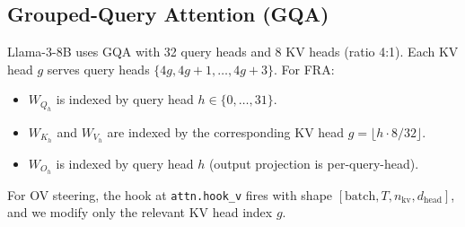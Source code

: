 \documentclass{article} %
\theoremstyle{plain}
\theoremstyle{definition}
\theoremstyle{remark}
\newcommand{\dhead}{d_{\mathrm{head}}}
\begin{document}
\subsection{Grouped-Query Attention (GQA)}
\label{app:gqa}

Llama-3-8B uses GQA with 32 query heads and 8 KV heads (ratio 4:1). Each KV head $g$ serves query heads $\{4g, 4g+1, \ldots, 4g+3\}$. For FRA:
\begin{itemize}
    \item $W_{Q_h}$ is indexed by query head $h \in \{0, \ldots, 31\}$.
    \item $W_{K_h}$ and $W_{V_h}$ are indexed by the corresponding KV head $g = \lfloor h \cdot 8 / 32 \rfloor$.
    \item $W_{O_h}$ is indexed by query head $h$ (output projection is per-query-head).
\end{itemize}
For OV steering, the hook at \texttt{attn.hook\_v} fires with shape $[\text{batch}, T, n_{\mathrm{kv}}, \dhead]$, and we modify only the relevant KV head index $g$.
\end{document}

